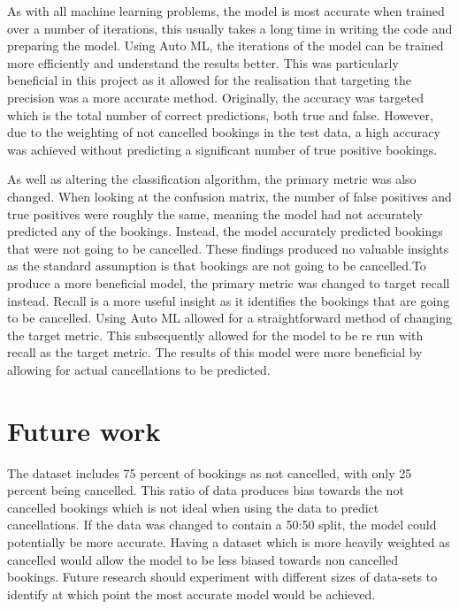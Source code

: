 \vspace{5mm}

As with all machine learning problems, the model is most accurate when trained over a number of iterations, this usually takes a long time in writing the code and preparing the model. Using Auto ML, the iterations of the model can be trained more efficiently and understand the results better. This was particularly beneficial in this project as it allowed for the realisation that targeting the precision was a more accurate method. Originally, the accuracy was targeted which is the total number of correct predictions, both true and false. However, due to the weighting of not cancelled bookings in the test data, a high accuracy was achieved without predicting a significant number of true positive bookings. 

\vspace{5mm}

As well as altering the classification algorithm, the primary metric was also changed. When looking at the confusion matrix, the number of false positives and true positives were roughly the same, meaning the model had not accurately predicted any of the bookings. Instead, the model accurately predicted bookings that were not going to be cancelled. These findings produced no valuable insights as the standard assumption is that bookings are not going to be cancelled.To produce a more beneficial model, the primary metric was changed to target recall instead. Recall is a more useful insight as it identifies the bookings that are going to be cancelled. Using Auto ML allowed for a straightforward method of changing the target metric. This subsequently allowed for the model to be re run with recall as the target metric. The results of this model were more beneficial by allowing for actual cancellations to be predicted. 

\section{Future work}
The dataset includes 75 percent of bookings as not cancelled, with only 25 percent being cancelled. This ratio of data produces bias towards the not cancelled bookings which is not ideal when using the data to predict cancellations. If the data was changed to contain a 50:50 split, the model could potentially be more accurate. Having a dataset which is more heavily weighted as cancelled would allow the model to be less biased towards non cancelled bookings. Future research should experiment with different sizes of data-sets to identify at which point the most accurate model would be achieved. 

